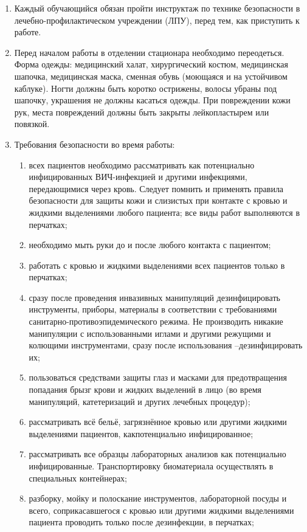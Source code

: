\documentclass[a4paper,14pt]{extarticle}
\begin{document}
\begin{enumerate}
\item Каждый обучающийся обязан пройти инструктаж по технике безопасности в лечебно-профилактическом учреждении (ЛПУ), перед тем, как приступить к работе.
\item Перед  началом  работы  в  отделении  стационара  необходимо  переодеться.
Форма одежды: медицинский халат, хирургический костюм, медицинская шапочка, медицинская маска, сменная обувь (моющаяся и на устойчивом каблуке).
Ногти должны быть коротко острижены, волосы убраны под шапочку, украшения не должны касаться одежды.
При повреждении кожи рук, места повреждений  должны быть закрыты лейкопластырем или повязкой.
\item Требования безопасности во время работы:

\begin{enumerate}
\item всех  пациентов  необходимо  рассматривать  как  потенциально  инфицированных ВИЧ-инфекцией  и  другими инфекциями,  передающимися  через  кровь.  Следует помнить и применять правила безопасности для защиты кожи и слизистых при контакте  с  кровью  и  жидкими  выделениями  любого  пациента;  все  виды  работ выполняются в перчатках;
\item необходимо мыть руки до и после любого контакта с пациентом;
\item работать с кровью и жидкими выделениями всех пациентов только в перчатках;
\item сразу после проведения инвазивных манипуляций дезинфицировать инструменты, приборы,   материалы   в   соответствии   с   требованиями   санитарно-противоэпидемического  режима.  Не  производить  никакие  манипуляции  с использованными иглами и другими режущими и колющими инструментами, сразу после использования –дезинфицировать их; 
\item пользоваться средствами защиты глаз и масками для предотвращения попадания брызг крови и жидких выделений в лицо (во время манипуляций, катетеризаций и других лечебных процедур);
\item рассматривать всё бельё, загрязнённое кровью или другими жидкими выделениями пациентов, какпотенциально инфицированное;
\item рассматривать  все  образцы  лабораторных  анализов  как  потенциально инфицированные.  Транспортировку  биоматериала  осуществлять  в  специальных контейнерах;
\item разборку,  мойку  и  полоскание  инструментов,  лабораторной  посуды  и  всего, соприкасавшегося  с  кровью  или  другими  жидкими  выделениями  пациента проводить только после дезинфекции, в перчатках;

\end{enumerate}
\end{enumerate}
\end{document}
